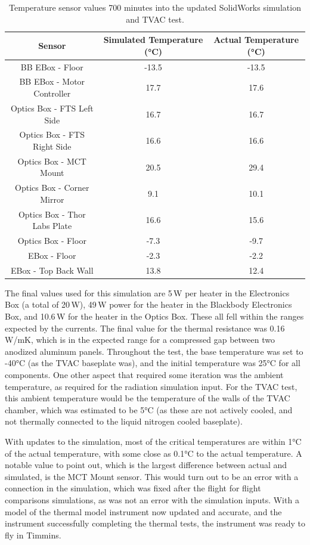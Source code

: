 \begin{table}[h]
\begin{center}
\begin{tabular}{ |c|c|c| }
 \hline
 \rowcolor{lightgray}
 Sensor & Simulated Temperature (°C) & Actual Temperature (°C)\\
  \hline
  \hline
  BB EBox - Floor & -13.5 & -13.5\\
 \hline
  BB EBox - Motor Controller & 17.7 & 17.6\\
 \hline
 Optics Box - FTS Left Side & 16.7 & 16.7\\
 \hline
 Optics Box - FTS Right Side & 16.6 & 16.6\\
 \hline
 Optics Box - MCT Mount & 20.5 & 29.4\\
 \hline
 Optics Box - Corner Mirror & 9.1 & 10.1\\
 \hline
 Optics Box - Thor Labs Plate & 16.6 & 15.6\\
 \hline
 Optics Box - Floor & -7.3 & -9.7\\
 \hline
 EBox - Floor & -2.3 & -2.2\\
 \hline
 EBox - Top Back Wall & 13.8 & 12.4\\
 \hline
\end{tabular}
\end{center}
\caption{Temperature sensor values 700 minutes into the updated SolidWorks simulation and TVAC test.}
 \label{TVAC_temps}
\end{table}

The final values used for this simulation are 5\,W per heater in the Electronics Box (a total of 20\,W), 49\,W power for the heater in the Blackbody Electronics Box, and 10.6\,W for the heater in the Optics Box. These all fell within the ranges expected by the currents. The final value for the thermal resistance was 0.16\,W/mK, which is in the expected range for a compressed gap between two anodized aluminum panels. Throughout the test, the base temperature was set to -40°C (as the TVAC baseplate was), and the initial temperature was 25°C for all components. One other aspect that required some iteration was the ambient temperature, as required for the radiation simulation input. For the TVAC test, this ambient temperature would be the temperature of the walls of the TVAC chamber, which was estimated to be 5°C (as these are not actively cooled, and not thermally connected to the liquid nitrogen cooled baseplate). 

With updates to the simulation, most of the critical temperatures are within 1°C of the actual temperature, with some close as 0.1°C to the actual temperature. A notable value to point out, which is the largest difference between actual and simulated, is the MCT Mount sensor. This would turn out to be an error with a connection in the simulation, which was fixed after the flight for flight comparisons simulations, as was not an error with the simulation inputs. With a model of the thermal model instrument now updated and accurate, and the instrument successfully completing the thermal tests, the instrument was ready to fly in Timmins.

